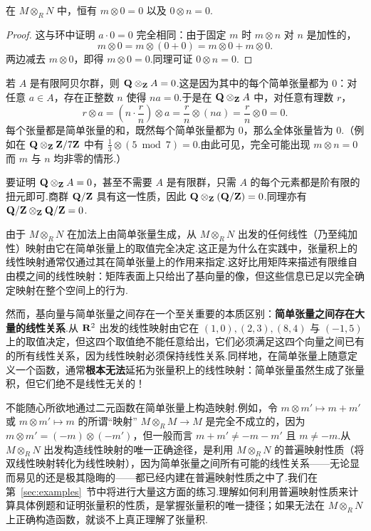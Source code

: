 \begin{theorem}\label{thm:zero-tensor}
在 $M \otimes_R N$ 中，恒有 $m \otimes 0 = 0$ 以及 $0 \otimes n = 0$.
\end{theorem}

\begin{proof}
这与环中证明 $a \cdot 0 = 0$ 完全相同：由于固定 $m$ 时 $m \otimes n$ 对 $n$ 是加性的，
\[
  m \otimes 0 = m \otimes (0 + 0) = m \otimes 0 + m \otimes 0.
\]
两边减去 $m \otimes 0$，即得 $m \otimes 0 = 0$.同理可证 $0 \otimes n = 0$.
\end{proof}

\begin{example}\label{ex:torsion-collapse}
若 $A$ 是有限阿贝尔群，则 $\mathbf{Q} \otimes_{\mathbf{Z}} A = 0$.这是因为其中的每个简单张量都为 $0$：对任意 $a \in A$，存在正整数 $n$ 使得 $na = 0$.于是在 $\mathbf{Q} \otimes_{\mathbf{Z}} A$ 中，对任意有理数 $r$，
\[
  r \otimes a = \left(n \cdot \frac{r}{n}\right) \otimes a = \frac{r}{n} \otimes (na) = \frac{r}{n} \otimes 0 = 0.
\]
每个张量都是简单张量的和，既然每个简单张量都为 $0$，那么全体张量皆为 $0$.（例如在 $\mathbf{Q} \otimes_{\mathbf{Z}} \mathbf{Z}/7\mathbf{Z}$ 中有 $\frac{1}{3} \otimes (5 \bmod 7) = 0$.由此可见，完全可能出现 $m \otimes n = 0$ 而 $m$ 与 $n$ 均非零的情形.）

要证明 $\mathbf{Q} \otimes_{\mathbf{Z}} A = 0$，甚至不需要 $A$ 是有限群，只需 $A$ 的每个元素都是阶有限的扭元即可.商群 $\mathbf{Q}/\mathbf{Z}$ 具有这一性质，因此 $\mathbf{Q} \otimes_{\mathbf{Z}} (\mathbf{Q}/\mathbf{Z}) = 0$.同理亦有 $\mathbf{Q}/\mathbf{Z} \otimes_{\mathbf{Z}} \mathbf{Q}/\mathbf{Z} = 0$.
\end{example}

由于 $M \otimes_R N$ 在加法上由简单张量生成，从 $M \otimes_R N$ 出发的任何线性（乃至纯加性）映射由它在简单张量上的取值完全决定.这正是为什么在实践中，张量积上的线性映射通常仅通过其在简单张量上的作用来指定.这好比用矩阵来描述有限维自由模之间的线性映射：矩阵表面上只给出了基向量的像，但这些信息已足以完全确定映射在整个空间上的行为.

然而，基向量与简单张量之间存在一个至关重要的本质区别：\textbf{简单张量之间存在大量的线性关系}.从 $\mathbf{R}^2$ 出发的线性映射由它在 $(1, 0), (2, 3), (8, 4)$ 与 $(-1, 5)$ 上的取值决定，但这四个取值绝不能任意给出，它们必须满足这四个向量之间已有的所有线性关系，因为线性映射必须保持线性关系.同样地，在简单张量上随意定义一个函数，通常\textbf{根本无法}延拓为张量积上的线性映射：简单张量虽然生成了张量积，但它们绝不是线性无关的！

不能随心所欲地通过二元函数在简单张量上构造映射.例如，令 $m \otimes m' \mapsto m + m'$ 或 $m \otimes m' \mapsto m$ 的所谓``映射'' $M \otimes_R M \to M$ 是完全不成立的，因为 $m \otimes m' = (-m) \otimes (-m')$，但一般而言 $m + m' \neq -m - m'$ 且 $m \neq -m$.从 $M \otimes_R N$ 出发构造线性映射的唯一正确途径，是利用 $M \otimes_R N$ 的普遍映射性质（将双线性映射转化为线性映射），因为简单张量之间所有可能的线性关系——无论显而易见的还是极其隐晦的——都已经内建在普遍映射性质之中了.我们在第~\ref{sec:examples}~节中将进行大量这方面的练习.理解如何利用普遍映射性质来计算具体例题和证明张量积的性质，是掌握张量积的唯一捷径；如果无法在 $M \otimes_R N$ 上正确构造函数，就谈不上真正理解了张量积.

